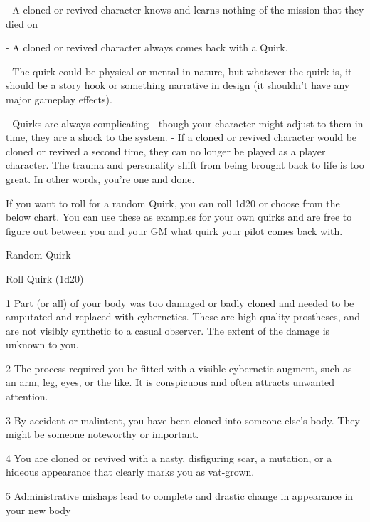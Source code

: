     -    A cloned or revived character knows and learns nothing of the mission that they died on
 
    -    A cloned or revived character always comes back with a Quirk. 
 
             -   The quirk could be physical or mental in nature, but whatever the quirk is, it  
                 should be a story hook or something narrative in design (it shouldn’t have any  
                 major gameplay effects). 
 
             -   Quirks are always complicating - though your character might adjust to them in  
                 time, they are a shock to the system.  
    -    If a cloned or revived character would be cloned or revived a second time, they can no  
         longer be played as a player character. The trauma and personality shift from being  
         brought back to life is too great. In other words, you’re one and done.
 

If you want to roll for a random Quirk, you can roll 1d20 or choose from the below chart. You can  
use these as examples for your own quirks and are free to figure out between you and your GM  
what quirk your pilot comes back with.
 

                                                 Random Quirk
 

 Roll
      Quirk 
 (1d20) 

 1          Part (or all) of your body was too damaged or badly cloned and needed to be amputated and  
            replaced with cybernetics. These are high quality prostheses, and are not visibly synthetic to a  
            casual observer. The extent of the damage is unknown to you.  

                                                                                                                 


2          The process required you be fitted with a visible cybernetic augment, such as an arm, leg,  
           eyes, or the like. It is conspicuous and often attracts unwanted attention. 

3          By accident or malintent, you have been cloned into someone else’s body. They might be  
           someone noteworthy or important. 

4          You are cloned or revived with a nasty, disfiguring scar, a mutation, or a hideous appearance  
           that clearly marks you as vat-grown. 

5          Administrative mishaps lead to complete and drastic change in appearance in your new body 

